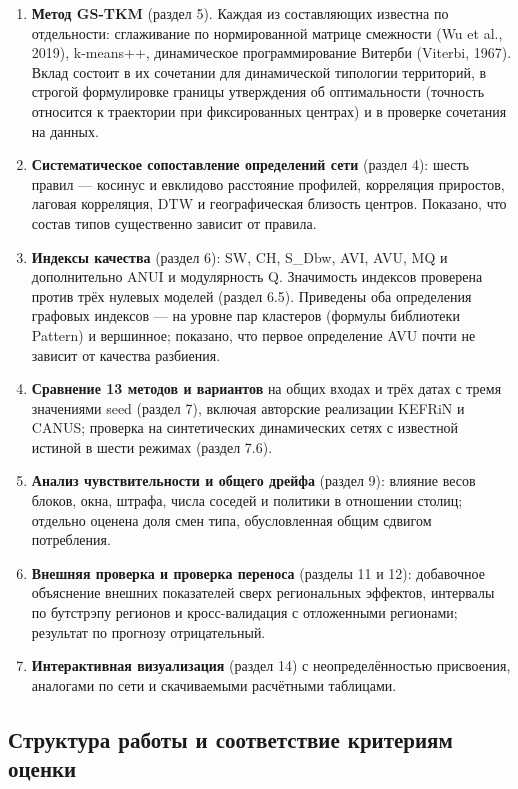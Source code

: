 \documentclass[11pt,a4paper]{article}
\providecommand{\tightlist}{\setlength{\itemsep}{1pt}\setlength{\parskip}{0pt}}
\begin{document}
\begin{enumerate}
\def\labelenumi{\arabic{enumi}.}
\tightlist
\item
  \textbf{Метод GS-TKM} (раздел 5). Каждая из составляющих известна по отдельности: сглаживание по нормированной матрице смежности (Wu et al., 2019), k-means++, динамическое программирование Витерби (Viterbi, 1967). Вклад состоит в их сочетании для динамической типологии территорий, в строгой формулировке границы утверждения об оптимальности (точность относится к траектории при фиксированных центрах) и в проверке сочетания на данных.
\item
  \textbf{Систематическое сопоставление определений сети} (раздел 4): шесть правил --- косинус и евклидово расстояние профилей, корреляция приростов, лаговая корреляция, DTW и географическая близость центров. Показано, что состав типов существенно зависит от правила.
\item
  \textbf{Индексы качества} (раздел 6): SW, CH, S\_Dbw, AVI, AVU, MQ и дополнительно ANUI и модулярность Q. Значимость индексов проверена против трёх нулевых моделей (раздел 6.5). Приведены оба определения графовых индексов --- на уровне пар кластеров (формулы библиотеки Pattern) и вершинное; показано, что первое определение AVU почти не зависит от качества разбиения.
\item
  \textbf{Сравнение 13 методов и вариантов} на общих входах и трёх датах с тремя значениями seed (раздел 7), включая авторские реализации KEFRiN и CANUS; проверка на синтетических динамических сетях с известной истиной в шести режимах (раздел 7.6).
\item
  \textbf{Анализ чувствительности и общего дрейфа} (раздел 9): влияние весов блоков, окна, штрафа, числа соседей и политики в отношении столиц; отдельно оценена доля смен типа, обусловленная общим сдвигом потребления.
\item
  \textbf{Внешняя проверка и проверка переноса} (разделы 11 и 12): добавочное объяснение внешних показателей сверх региональных эффектов, интервалы по бутстрэпу регионов и кросс-валидация с отложенными регионами; результат по прогнозу отрицательный.
\item
  \textbf{Интерактивная визуализация} (раздел 14) с неопределённостью присвоения, аналогами по сети и скачиваемыми расчётными таблицами.
\end{enumerate}


\subsection{Структура работы и соответствие критериям оценки}\label{ux441ux442ux440ux443ux43aux442ux443ux440ux430-ux440ux430ux431ux43eux442ux44b-ux438-ux441ux43eux43eux442ux432ux435ux442ux441ux442ux432ux438ux435-ux43aux440ux438ux442ux435ux440ux438ux44fux43c-ux43eux446ux435ux43dux43aux438}
\end{document}
